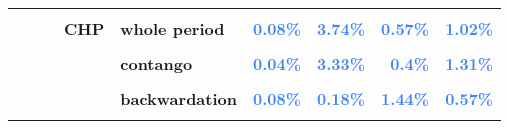 \documentclass[
  authoryear,
  preprint,
  3p]{elsarticle}
\begin{document}
\begin{landscape}
\begin{longtable}[t]{>{}l>{}l>{}l>{}l>{}l>{}r>{}r>{}r>{}r}
\textbf{\cellcolor{gray!10}{}} & \textbf{\cellcolor{gray!10}{}} & \textbf{\cellcolor{gray!10}{}} & \textbf{\cellcolor{gray!10}{}} & \textbf{\cellcolor{gray!10}{contango}} & \textcolor[HTML]{4285f4}{\textbf{\cellcolor{gray!10}{1.48\%}}} & \textcolor[HTML]{4285f4}{\textbf{\cellcolor{gray!10}{10.88\%}}} & \textcolor[HTML]{4285f4}{\textbf{\cellcolor{gray!10}{33.45\%}}} & \textcolor[HTML]{4285f4}{\textbf{\cellcolor{gray!10}{14.35\%}}}\\
\textbf{} & \textbf{} & \textbf{} & \textbf{CHP} & \textbf{whole period} & \textcolor[HTML]{4285f4}{\textbf{0.08\%}} & \textcolor[HTML]{4285f4}{\textbf{3.74\%}} & \textcolor[HTML]{4285f4}{\textbf{0.57\%}} & \textcolor[HTML]{4285f4}{\textbf{1.02\%}}\\
\textbf{\cellcolor{gray!10}{}} & \textbf{\cellcolor{gray!10}{}} & \textbf{\cellcolor{gray!10}{}} & \textbf{\cellcolor{gray!10}{}} & \textbf{\cellcolor{gray!10}{backwardation}} & \textcolor[HTML]{4285f4}{\textbf{\cellcolor{gray!10}{0.24\%}}} & \textcolor[HTML]{4285f4}{\textbf{\cellcolor{gray!10}{4.26\%}}} & \textcolor[HTML]{4285f4}{\textbf{\cellcolor{gray!10}{1.09\%}}} & \textcolor[HTML]{4285f4}{\textbf{\cellcolor{gray!10}{0.72\%}}}\\
\textbf{} & \textbf{} & \textbf{} & \textbf{} & \textbf{contango} & \textcolor[HTML]{4285f4}{\textbf{0.04\%}} & \textcolor[HTML]{4285f4}{\textbf{3.33\%}} & \textcolor[HTML]{4285f4}{\textbf{0.4\%}} & \textcolor[HTML]{4285f4}{\textbf{1.31\%}}\\
\addlinespace
\textbf{\cellcolor{gray!10}{}} & \textbf{\cellcolor{gray!10}{}} & \textbf{\cellcolor{gray!10}{}} & \textbf{\cellcolor{gray!10}{open interest}} & \textbf{\cellcolor{gray!10}{whole period}} & \textcolor[HTML]{4285f4}{\textbf{\cellcolor{gray!10}{0.07\%}}} & \textcolor[HTML]{4285f4}{\textbf{\cellcolor{gray!10}{0.34\%}}} & \textcolor[HTML]{4285f4}{\textbf{\cellcolor{gray!10}{2.17\%}}} & \textcolor[HTML]{4285f4}{\textbf{\cellcolor{gray!10}{0.42\%}}}\\
\textbf{} & \textbf{} & \textbf{} & \textbf{} & \textbf{backwardation} & \textcolor[HTML]{4285f4}{\textbf{0.08\%}} & \textcolor[HTML]{4285f4}{\textbf{0.18\%}} & \textcolor[HTML]{4285f4}{\textbf{1.44\%}} & \textcolor[HTML]{4285f4}{\textbf{0.57\%}}\\
\textbf{\cellcolor{gray!10}{}} & \textbf{\cellcolor{gray!10}{}} & \textbf{\cellcolor{gray!10}{}} & \textbf{\cellcolor{gray!10}{}} & \textbf{\cellcolor{gray!10}{contango}} & \textcolor[HTML]{4285f4}{\textbf{\cellcolor{gray!10}{0.22\%}}} & \textcolor[HTML]{4285f4}{\textbf{\cellcolor{gray!10}{0.59\%}}} & \textcolor[HTML]{4285f4}{\textbf{\cellcolor{gray!10}{2.7\%}}} & \textcolor[HTML]{4285f4}{\textbf{\cellcolor{gray!10}{0.39\%}}}\\

\end{longtable}
\end{landscape}
\end{document}
